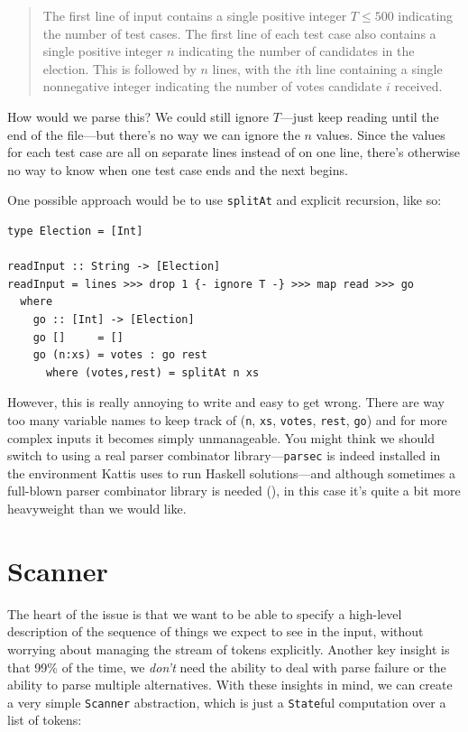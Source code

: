 \documentclass{book}
\newcommand{\pref}[1]{\prettyref{#1}}
\newcommand{\h}[1]{\texttt{#1}}
\begin{document}
\begin{quote}
The first line of input contains a single positive integer $T \leq 500$
indicating the number of test cases. The first line of each test case
also contains a single positive integer $n$ indicating the number of
candidates in the election. This is followed by $n$ lines, with the $i$th
line containing a single nonnegative integer indicating the number of
votes candidate $i$ received.
\end{quote}

How would we parse this?  We could still ignore $T$---just keep reading
until the end of the file---but there's no way we can ignore the $n$
values. Since the values for each test case are all on separate lines
instead of on one line, there's otherwise no way to know when one test
case ends and the next begins.

One possible approach would be to use \h{splitAt} and explicit
recursion, like so:

\begin{verbatim}
type Election = [Int]

readInput :: String -> [Election]
readInput = lines >>> drop 1 {- ignore T -} >>> map read >>> go
  where
    go :: [Int] -> [Election]
    go []     = []
    go (n:xs) = votes : go rest
      where (votes,rest) = splitAt n xs
\end{verbatim}

However, this is really annoying to write and easy to get wrong.
There are way too many variable names to keep track of (\h{n}, \h{xs},
\h{votes}, \h{rest}, \h{go}) and for more complex inputs it becomes
simply unmanageable.  You might think we should switch to using a real
parser combinator library---\h{parsec} is indeed installed in the
environment Kattis uses to run Haskell solutions---and although
sometimes a full-blown parser combinator library is needed
(\pref{chap:parser-combs}), in this case it's quite a bit more
heavyweight than we would like.

\section{Scanner}
\label{sec:scanner}

The heart of the issue is that we want to be able to specify a
high-level description of the sequence of things we expect to see in
the input, without worrying about managing the stream of tokens
explicitly.  Another key insight is that 99\% of the time, we
\emph{don't} need the ability to deal with parse failure or the
ability to parse multiple alternatives.  With these insights in mind,
we can create a very simple \h{Scanner} abstraction, which is just a
\h{State}ful computation over a list of tokens:
\end{document}

